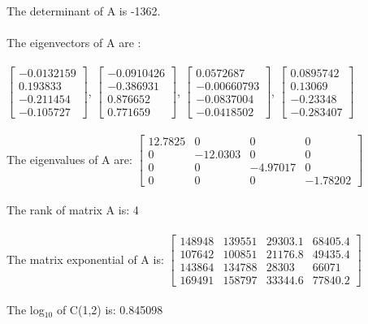 \\
The determinant of A is -1362.\\
\\
The eigenvectors of A are :\\
\\
$\begin{bmatrix}-0.0132159 \\0.193833 \\-0.211454 \\-0.105727\end{bmatrix}$,
 $\begin{bmatrix}-0.0910426 \\-0.386931 \\0.876652 \\0.771659\end{bmatrix}$,
 $\begin{bmatrix}0.0572687 \\-0.00660793 \\-0.0837004 \\-0.0418502\end{bmatrix}$,
 $\begin{bmatrix}0.0895742 \\0.13069 \\-0.23348 \\-0.283407\end{bmatrix}$\\
\\
 The eigenvalues of A are: $\begin{bmatrix}
12.7825 & 0 & 0 & 0 \\0 & -12.0303 & 0 & 0 \\0 & 0 & -4.97017 & 0 \\0 & 0 & 0 & -1.78202
\end{bmatrix}$\\
\\
The rank of matrix A is: 4\\
\\
The matrix exponential of A is: $\begin{bmatrix}
148948 & 139551 & 29303.1 & 68405.4 \\107642 & 100851 & 21176.8 & 49435.4 \\143864 & 134788 & 28303 & 66071 \\169491 & 158797 & 33344.6 & 77840.2
\end{bmatrix}$\\
\\
The log$_10$ of C(1,2) is: 0.845098\\
\\

